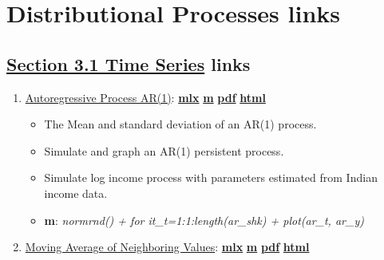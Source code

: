 \documentclass[
]{book}
\providecommand{\tightlist}{%
  \setlength{\itemsep}{0pt}\setlength{\parskip}{0pt}}
\begin{document}
\hypertarget{distributional-processes-links}{%
\section{Distributional Processes links}\label{distributional-processes-links}}

\hypertarget{section-3.1-time-seriestime-series-links}{%
\subsection{\texorpdfstring{\protect\hyperlink{time-series}{Section 3.1 Time Series} links}{Section 3.1 Time Series links}}\label{section-3.1-time-seriestime-series-links}}

\begin{enumerate}
\def\labelenumi{\arabic{enumi}.}
\tightlist
\item
  \href{https://fanwangecon.github.io/M4Econ/panel/timeseries/htmlpdfm/fs_autoregressive.html}{Autoregressive Process AR(1)}: \href{https://github.com/FanWangEcon/M4Econ/blob/master/panel/timeseries/fs_autoregressive.mlx}{\textbf{mlx}} \textbar{} \href{https://github.com/FanWangEcon/M4Econ/blob/master/panel/timeseries/htmlpdfm/fs_autoregressive.m}{\textbf{m}} \textbar{} \href{https://github.com/FanWangEcon/M4Econ/blob/master/panel/timeseries/htmlpdfm/fs_autoregressive.pdf}{\textbf{pdf}} \textbar{} \href{https://fanwangecon.github.io/M4Econ/panel/timeseries/htmlpdfm/fs_autoregressive.html}{\textbf{html}}

  \begin{itemize}
  \tightlist
  \item
    The Mean and standard deviation of an AR(1) process.
  \item
    Simulate and graph an AR(1) persistent process.
  \item
    Simulate log income process with parameters estimated from Indian income data.
  \item
    \textbf{m}: \emph{normrnd() + for it\_t=1:1:length(ar\_shk) + plot(ar\_t, ar\_y)}
  \end{itemize}
\item
  \href{https://fanwangecon.github.io/M4Econ/panel/timeseries/htmlpdfm/fs_movingaverage.html}{Moving Average of Neighboring Values}: \href{https://github.com/FanWangEcon/M4Econ/blob/master/panel/timeseries/fs_movingaverage.mlx}{\textbf{mlx}} \textbar{} \href{https://github.com/FanWangEcon/M4Econ/blob/master/panel/timeseries/htmlpdfm/fs_movingaverage.m}{\textbf{m}} \textbar{} \href{https://github.com/FanWangEcon/M4Econ/blob/master/panel/timeseries/htmlpdfm/fs_movingaverage.pdf}{\textbf{pdf}} \textbar{} \href{https://fanwangecon.github.io/M4Econ/panel/timeseries/htmlpdfm/fs_movingaverage.html}{\textbf{html}}


\end{enumerate}
\end{document}
